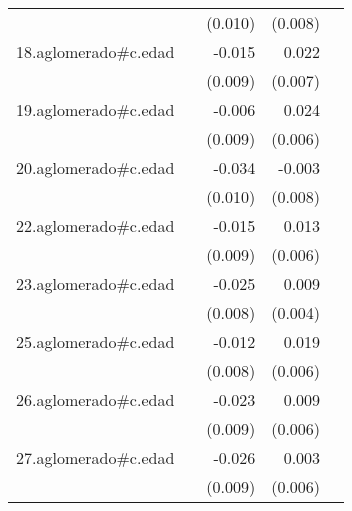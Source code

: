 {\begin{longtable}{l*{4}{D{.}{.}{-1}}}
            &                     &     (0.010)         &     (0.008)         &                     \\
\addlinespace
18.aglomerado#c.edad&                     &      -0.015         &       0.022\sym{***}&                     \\
            &                     &     (0.009)         &     (0.007)         &                     \\
\addlinespace
19.aglomerado#c.edad&                     &      -0.006         &       0.024\sym{***}&                     \\
            &                     &     (0.009)         &     (0.006)         &                     \\
\addlinespace
20.aglomerado#c.edad&                     &      -0.034\sym{***}&      -0.003         &                     \\
            &                     &     (0.010)         &     (0.008)         &                     \\
\addlinespace
22.aglomerado#c.edad&                     &      -0.015         &       0.013\sym{*}  &                     \\
            &                     &     (0.009)         &     (0.006)         &                     \\
\addlinespace
23.aglomerado#c.edad&                     &      -0.025\sym{**} &       0.009\sym{*}  &                     \\
            &                     &     (0.008)         &     (0.004)         &                     \\
\addlinespace
25.aglomerado#c.edad&                     &      -0.012         &       0.019\sym{**} &                     \\
            &                     &     (0.008)         &     (0.006)         &                     \\
\addlinespace
26.aglomerado#c.edad&                     &      -0.023\sym{**} &       0.009         &                     \\
            &                     &     (0.009)         &     (0.006)         &                     \\
\addlinespace
27.aglomerado#c.edad&                     &      -0.026\sym{**} &       0.003         &                     \\
            &                     &     (0.009)         &     (0.006)         &                     \\

\end{longtable}}

